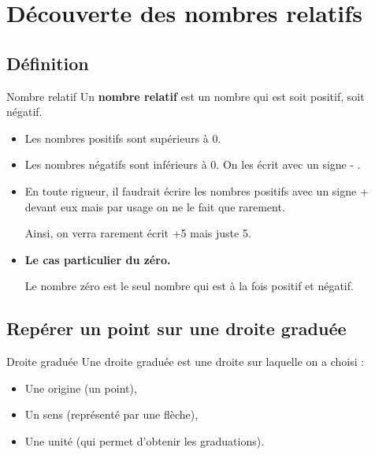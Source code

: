 \documentclass[a4paper]{book}
\begin{document}
\setcounter{chapter}{3}
\renewcommand{\monTitre}{Découverte des nombres relatifs}
\chapter{\monTitre}
\thispagestyle{fancy} 

\section{Définition}

    \begin{definitionTitre}{Nombre relatif}
        Un \textbf{nombre relatif} est un nombre qui est soit positif, soit négatif.
        \begin{itemize}
            \item Les nombres positifs sont supérieurs à 0.
            \item Les nombres négatifs sont inférieurs à 0. On les écrit avec un signe \og - \fg.
        \end{itemize}
    \end{definitionTitre}


    \begin{remarque}
        \begin{itemize}
            \item En toute rigueur, il faudrait écrire les nombres positifs avec un signe \og + \fg devant eux mais par usage on ne le fait que rarement.
    
            Ainsi, on verra rarement écrit +5 mais juste 5.

            \item \textbf{Le cas particulier du zéro.}

            Le nombre zéro est le seul nombre qui est à la fois positif et négatif.
        \end{itemize}   
    \end{remarque}


\section{Repérer un point sur une droite graduée}

    \begin{definitionTitre}{Droite graduée} 
        Une droite graduée est une droite sur laquelle on a choisi :
        \begin{itemize}
            \item Une origine (un point),
            \item Un sens (représenté par une flèche),
            \item Une unité (qui permet d'obtenir les graduations).
        \end{itemize}
    \end{definitionTitre}
\end{document}
